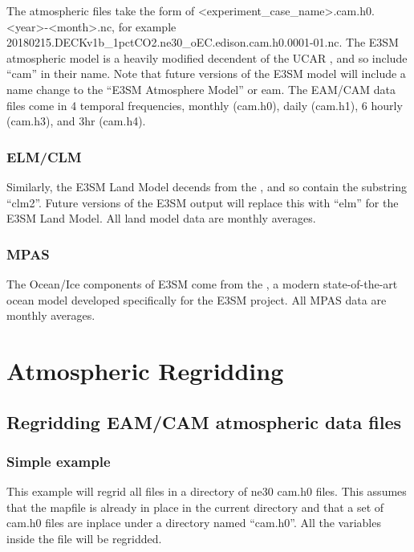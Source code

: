 \documentclass[letterpaper,10pt,english]{sphinxmanual}
\begin{document}
The atmospheric files take the form of \textless{}experiment\_case\_name\textgreater{}.cam.h0.\textless{}year\textgreater{}-\textless{}month\textgreater{}.nc, for example 20180215.DECKv1b\_1pctCO2.ne30\_oEC.edison.cam.h0.0001-01.nc. The E3SM atmospheric model is a heavily modified decendent of the
UCAR , and so include “cam” in their name. Note that future versions of the E3SM model will include a name change to the “E3SM Atmosphere Model” or eam. The EAM/CAM
data files come in 4 temporal frequencies, monthly (cam.h0), daily (cam.h1), 6 hourly (cam.h3), and 3hr (cam.h4).


\subsection{ELM/CLM}
\label{\detokenize{guide:elm-clm}}
Similarly, the E3SM Land Model decends from the , and so contain the substring “clm2”. Future versions of the E3SM output will replace this with
“elm” for the E3SM Land Model. All land model data are monthly averages.


\subsection{MPAS}
\label{\detokenize{guide:mpas}}
The Ocean/Ice components of E3SM come from the , a modern state-of-the-art ocean model developed specifically for the E3SM project. All MPAS
data are monthly averages.


\chapter{Atmospheric Regridding}
\label{\detokenize{atm_regrid:atmospheric-regridding}}\label{\detokenize{atm_regrid:atm-regrid}}\label{\detokenize{atm_regrid::doc}}

\section{Regridding EAM/CAM atmospheric data files}
\label{\detokenize{atm_regrid:regridding-eam-cam-atmospheric-data-files}}

\subsection{Simple example}
\label{\detokenize{atm_regrid:simple-example}}
This example will regrid all files in a directory of ne30 cam.h0 files. This assumes that the mapfile is already in place in the current
directory and that a set of cam.h0 files are inplace under a directory named “cam.h0”. All the variables inside the file will be regridded.
\end{document}
